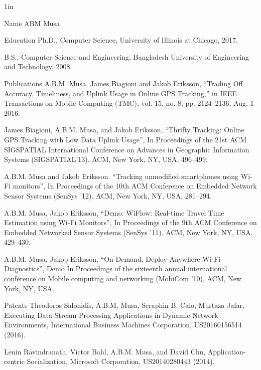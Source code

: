 \vita
\singlespace
\begin{list}
{}
{\setlength
   {}{1in}
    \setlength{\leftmargin}{0.8in}
    \setlength{\labelsep}{.2in}
    \setlength{\itemsep}{0.2in}
    \setlength{\rightmargin}{\leftmargin}}

\item[Name\hfill] ABM Musa

\item[Education\hfill] Ph.D., Computer Science, University of Illinois at Chicago, 2017.

B.S., Computer Science and Engineering, Bangladesh University of Engineering and Technology, 2008.

\item[Publications\hfill] 
A.B.M. Musa, James Biagioni and Jakob Eriksson, “Trading Off Accuracy, Timeliness, and Uplink Usage in Online GPS Tracking,” in IEEE Transactions on Mobile Computing (TMC), vol. 15, no. 8, pp. 2124--2136, Aug. 1 2016.

James Biagioni, A.B.M. Musa, and Jakob Eriksson, “Thrifty Tracking: Online GPS Tracking with Low Data Uplink Usage”, In Proceedings of the 21st ACM SIGSPATIAL International Conference on Advances in Geographic Information Systems (SIGSPATIAL’13). ACM, New York, NY, USA, 496--499.

A.B.M. Musa and Jakob Eriksson. “Tracking unmodified smartphones using Wi-Fi monitors”, In Proceedings of the 10th ACM Conference on Embedded Network Sensor Systems (SenSys ’12). ACM, New York, NY, USA, 281--294.

A.B.M. Musa, Jakob Eriksson, “Demo: WiFlow: Real-time Travel Time Estimation using Wi-Fi Monitors”, In Proceedings of the 9th ACM Conference on Embedded Networked Sensor Systems (SenSys ’11). ACM, New York, NY, USA, 429--430.

A.B.M. Musa, Jakob Eriksson, “On-Demand, Deploy-Anywhere Wi-Fi Diagnostics”, Demo In Proceedings of the sixteenth annual international conference on Mobile computing and networking (MobiCom ’10), ACM, New York, NY, USA.

\item[Patents\hfill]
Theodoros Salonidis, A.B.M. Musa, Seraphin B. Calo, Murtaza Jafar, Executing Data Stream Processing Applications in Dynamic Network Environments, International Business Machines Corporation, US20160156514 (2016).

Lenin Ravindranath, Victor Bahl, A.B.M. Musa, and David Chu, Application-centric Socialization, Microsoft Corporation, US20140280443 (2014).



\end{list}
